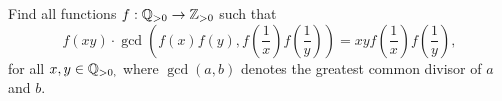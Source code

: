 Find all functions $f : \Bbb{Q}_{>0}\to \Bbb{Z}_{>0}$ such that $$f(xy)\cdot \gcd\left( f(x)f(y), f(\frac{1}{x})f(\frac{1}{y})\right)

= xyf(\frac{1}{x})f(\frac{1}{y}),$$for all $x, y \in  \Bbb{Q}_{>0,}$ where $\gcd(a, b)$ denotes the greatest common divisor of $a$ and $b.$